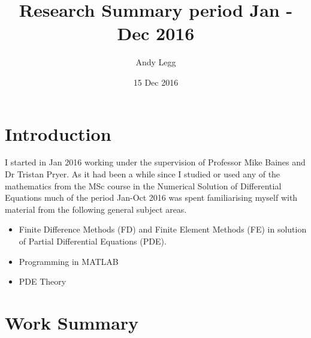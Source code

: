 \documentclass[11pt]{article}
\title{Research Summary period Jan - Dec 2016}
\author{Andy Legg}
\date{15 Dec 2016}
\begin{document}
\maketitle
\section{Introduction}
I started in Jan 2016 working under the supervision of Professor Mike Baines and Dr Tristan Pryer. As it had been a while since I studied or used any of the mathematics from the MSc course in the Numerical Solution of Differential Equations much of the period Jan-Oct 2016 was spent familiarising myself with material from the following general subject areas. 
\begin{itemize}
 \item Finite Difference Methods (FD) and Finite Element Methods (FE) in solution of Partial Differential Equations (PDE). 
 \item Programming in MATLAB
 \item PDE Theory
\end{itemize}
\section{Work Summary}
\end{document}
